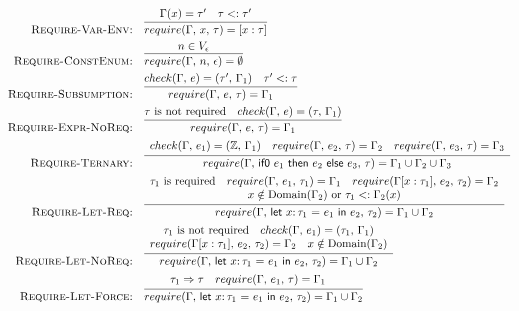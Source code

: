 \documentclass[peerreview, 10pt]{IEEEtran}
\newcommand{\Z}{\ensuremath{\mathbb{Z}}}
\newcommand{\lett}[4]{\ensuremath{\mathsf{let}\ #1\mathsf{:}\,#2\ \mathsf{=}\ #3\ \mathsf{in}\ #4}}
\newcommand{\ternary}[3]{\ensuremath{\mathsf{if0}\ #1\ \mathsf{then}\ #2\ \mathsf{else}\ #3}}
\newcommand{\checktype}[4]{\ensuremath{{check}(#1,\,#2)=(#3,\,#4)}}
\newcommand{\requiretype}[4]{\ensuremath{{require}(#1,\,#2,\,#3)=#4}}
\newcommand{\required}[1]{\ensuremath{#1\text{ is required}}}
\newcommand{\nrequired}[1]{\ensuremath{#1\text{ is not required}}}
\newcommand{\forcerequire}[2]{\ensuremath{#1\Rightarrow#2}}
\begin{document}
\begin{figure*}[ht]
\centering
\begin{framed}
\begin{align*}
\text{\textsc{Require-Var-Env:}} &\quad \infer{\requiretype{\Gamma}{x}{\tau}{[x:\tau]}}{\Gamma(x) = \tau' \quad \tau <: \tau'} \\
\text{\textsc{Require-ConstEnum:}} &\quad \infer{\requiretype{\Gamma}{n}{\epsilon}{\emptyset}}{n \in V_\epsilon} \\
\text{\textsc{Require-Subsumption:}} &\quad \infer{\requiretype{\Gamma}{e}{\tau}{\Gamma_1}}{\checktype{\Gamma}{e}{\tau'}{\Gamma_1} \quad \tau' <: \tau} \\
\text{\textsc{Require-Expr-NoReq:}} &\quad \infer{\requiretype{\Gamma}{e}{\tau}{\Gamma_1}}{\nrequired{\tau} \quad \checktype{\Gamma}{e}{\tau}{\Gamma_1}} \\
\text{\textsc{Require-Ternary:}} &\quad \infer{\requiretype{\Gamma}{\ternary{e_1}{e_2}{e_3}}{\tau}{\Gamma_1\cup \Gamma_2 \cup \Gamma_3}}{
\begin{array}{c}
\checktype{\Gamma}{e_1}{\Z}{\Gamma_1} \quad
\requiretype{\Gamma}{e_2}{\tau}{\Gamma_2} \quad \requiretype{\Gamma}{e_3}{\tau}{\Gamma_3}
\end{array}
} \\
\text{\textsc{Require-Let-Req:}} &\quad \infer{\requiretype{\Gamma}{\lett{x}{\tau_1}{e_1}{e_2}}{\tau_2}{\Gamma_1 \cup \Gamma_2}}{
\begin{array}{c}
\required{\tau_1} \quad \requiretype{\Gamma}{e_1}{\tau_1}{\Gamma_1} \quad
\requiretype{\Gamma[x:\tau_1]}{e_2}{\tau_2}{\Gamma_2}\\
x \notin \text{Domain}(\Gamma_2) \text{ or } \tau_1 <: \Gamma_2(x)
\end{array}
} \\
\text{\textsc{Require-Let-NoReq:}} &\quad \infer{\requiretype{\Gamma}{\lett{x}{\tau_1}{e_1}{e_2}}{\tau_2}{\Gamma_1 \cup \Gamma_2}}{
\begin{array}{c}
\nrequired{\tau_1} \quad \checktype{\Gamma}{e_1}{\tau_1}{\Gamma_1} \\
\requiretype{\Gamma[x:\tau_1]}{e_2}{\tau_2}{\Gamma_2} \quad x \notin \text{Domain}(\Gamma_2)
\end{array}
} \\
\text{\textsc{Require-Let-Force:}} &\quad \infer{\requiretype{\Gamma}{\lett{x}{\tau_1}{e_1}{e_2}}{\tau_2}{\Gamma_1 \cup \Gamma_2}}{
\begin{array}{c}
\forcerequire{\tau_1}{\tau} \quad \requiretype{\Gamma}{e_1}{\tau}{\Gamma_1} \quad

\end{array}}
\end{align*}
\end{framed}
\end{figure*}
\end{document}
